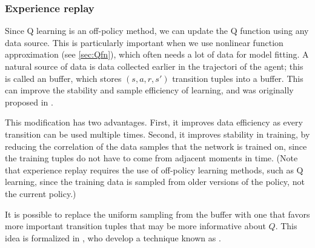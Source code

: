 \subsubsection{Experience replay}
\label{sec:ER}
\label{sec:replay}

Since Q learning is an off-policy method, we can update the Q function
using any data source. This is particularly important when we use
nonlinear function approximation (see \cref{sec:Qfn}), which often needs a lot of data
for model fitting.
A natural source of data is data collected earlier in the trajectori
of the agent; this is called 
an  buffer,
which stores  $(s,a,r,s')$ transition tuples into a buffer.
This can improve the stability and sample efficiency of learning,
and was
originally proposed in \citep{Lin1992}.

This modification has two advantages.
First, it improves data efficiency as every transition
can be used multiple times.
Second, it improves stability in training,
by reducing the correlation of the data samples
that the network is trained on,
since the training tuples do not have to come from
adjacent moments in time.
(Note that experience replay requires the use
of off-policy learning methods, such as Q learning,
since the training data is sampled from older
versions of the policy, not the current policy.)

\label{sec:PER}

It is possible to replace the uniform sampling
from the buffer
with one that favors more
important transition tuples
that may be more informative about $Q$.
This idea is formalized in 
\citep{Schaul2016},
who develop a technique known as
.


